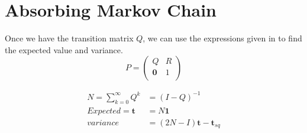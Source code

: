 \chapter{Absorbing Markov Chain}
Once we have the transition matrix $Q$, we can use the expressions given in \cite{wiki:markovWiki}
to find the expected value and variance. 
\begin{equation*}
	P  = \left(
	\begin{array}{cc}
	Q & R \\
		\mathbf{0} & 1 \\
	\end{array} \right)
\end{equation*}

\begin{align*}
	N = \sum_{k=0}^{\infty} Q^k &= (I-Q)^{-1}\\
	Expected = \mathbf{t} &= N\mathbf{1} \\
	variance &= (2N-I)\mathbf{t} - \mathbf{t}_{sq}
\end{align*}
